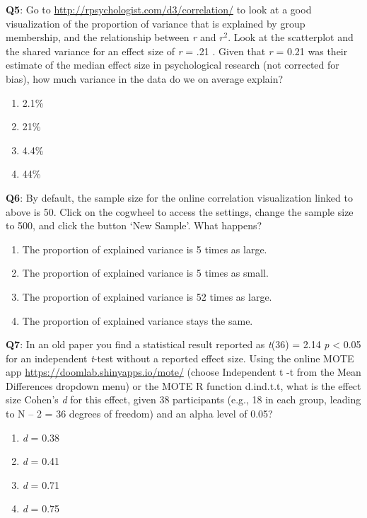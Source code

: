 \documentclass[
  oneside]{book}
\providecommand{\tightlist}{%
  \setlength{\itemsep}{0pt}\setlength{\parskip}{0pt}}
\begin{document}
\textbf{Q5}: Go to \url{http://rpsychologist.com/d3/correlation/} to look at a good visualization of the proportion of variance that is explained by group membership, and the relationship between \emph{r} and \(r^2\). Look at the scatterplot and the shared variance for an effect size of \emph{r} = .21 \citep{richard_one_2003}. Given that \emph{r} = 0.21 was their estimate of the median effect size in psychological research (not corrected for bias), how much variance in the data do we on average explain?

\begin{enumerate}
\def\labelenumi{\Alph{enumi})}
\tightlist
\item
  2.1\%
\item
  21\%
\item
  4.4\%
\item
  44\%
\end{enumerate}

\textbf{Q6}: By default, the sample size for the online correlation visualization linked to above is 50. Click on the cogwheel to access the settings, change the sample size to 500, and click the button `New Sample'. What happens?

\begin{enumerate}
\def\labelenumi{\Alph{enumi})}
\tightlist
\item
  The proportion of explained variance is 5 times as large.
\item
  The proportion of explained variance is 5 times as small.
\item
  The proportion of explained variance is 52 times as large.
\item
  The proportion of explained variance stays the same.
\end{enumerate}

\textbf{Q7}: In an old paper you find a statistical result reported as \emph{t}(36) = 2.14 \emph{p} \textless{} 0.05 for an independent \emph{t}-test without a reported effect size. Using the online MOTE app \url{https://doomlab.shinyapps.io/mote/} (choose Independent t -t from the Mean Differences dropdown menu) or the MOTE R function d.ind.t.t, what is the effect size Cohen's \emph{d} for this effect, given 38 participants (e.g., 18 in each group, leading to N -- 2 = 36 degrees of freedom) and an alpha level of 0.05?

\begin{enumerate}
\def\labelenumi{\Alph{enumi})}
\tightlist
\item
  \emph{d} = 0.38
\item
  \emph{d} = 0.41
\item
  \emph{d} = 0.71
\item
  \emph{d} = 0.75
\end{enumerate}
\end{document}

